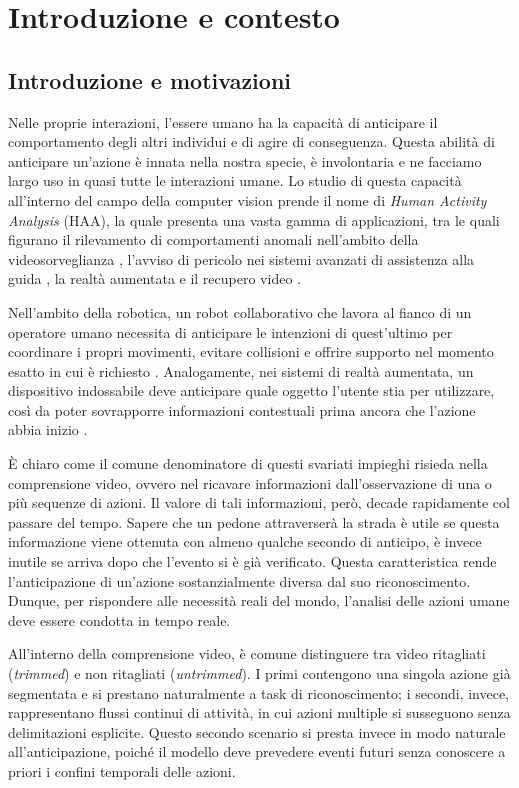 \chapter{Introduzione e contesto}
\label{cap1}
\section{Introduzione e motivazioni}
Nelle proprie interazioni, l'essere umano ha la capacità di anticipare il comportamento degli altri individui e di agire di conseguenza. Questa abilità di anticipare un'azione è innata nella nostra specie, è involontaria e ne facciamo largo uso in quasi tutte le interazioni umane. Lo studio di questa capacità all'interno del campo della computer vision prende il nome di \textit{Human Activity Analysis} (HAA), la quale presenta una vasta gamma di applicazioni, tra le quali figurano il rilevamento di comportamenti anomali nell'ambito della videosorveglianza \cite{poppe2010survey}, l'avviso di pericolo nei sistemi avanzati di assistenza alla guida \cite{rasouli2019autonomous}, la realtà aumentata \cite{billinghurst2015survey} e il recupero video \cite{snoek2009concept}.

Nell'ambito della robotica, un robot collaborativo che lavora al fianco di un operatore umano necessita di anticipare le intenzioni di quest'ultimo per coordinare i propri movimenti, evitare collisioni e offrire supporto nel momento esatto in cui è richiesto \cite{mainprice2013human}. Analogamente, nei sistemi di realtà aumentata, un dispositivo indossabile deve anticipare quale oggetto l'utente stia per utilizzare, così da poter sovrapporre informazioni contestuali prima ancora che l'azione abbia inizio \cite{damen2018scaling}.

È chiaro come il comune denominatore di questi svariati impieghi risieda nella comprensione video, ovvero nel ricavare informazioni dall'osservazione di una o più sequenze di azioni. Il valore di tali informazioni, però, decade rapidamente col passare del tempo. Sapere che un pedone attraverserà la strada è utile se questa informazione viene ottenuta con almeno qualche secondo di anticipo, è invece inutile se arriva dopo che l'evento si è già verificato. Questa caratteristica rende l'anticipazione di un'azione sostanzialmente diversa dal suo riconoscimento. Dunque, per rispondere alle necessità reali del mondo, l'analisi delle azioni umane deve essere condotta in tempo reale.

All'interno della comprensione video, è comune distinguere tra video ritagliati (\textit{trimmed}) e non ritagliati (\textit{untrimmed}). I primi contengono una singola azione già segmentata e si prestano naturalmente a task di riconoscimento; i secondi, invece, rappresentano flussi continui di attività, in cui azioni multiple si susseguono senza delimitazioni esplicite. Questo secondo scenario si presta invece in modo naturale all'anticipazione, poiché il modello deve prevedere eventi futuri senza conoscere a priori i confini temporali delle azioni.

